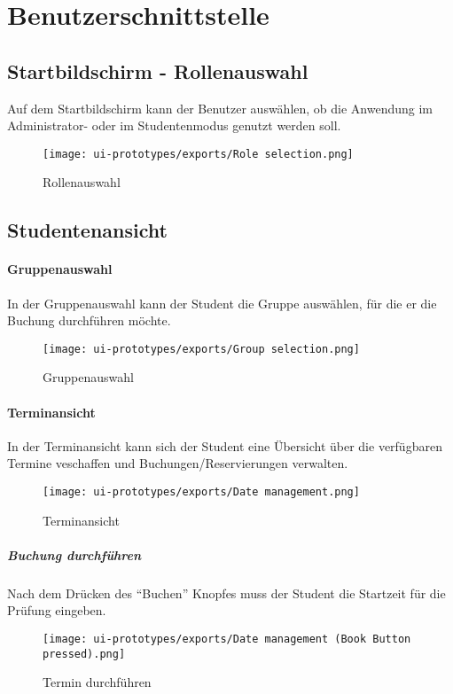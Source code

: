\section{Benutzerschnittstelle}
\subsection{Startbildschirm - Rollenauswahl}
Auf dem Startbildschirm kann der Benutzer auswählen, ob die Anwendung im
Administrator- oder im Studentenmodus genutzt werden soll.
\begin{figure}
  \centering
  \texttt{[image: ui-prototypes/exports/Role selection.png]}
  \caption{Rollenauswahl}
  \label{fig:role-selection}
\end{figure}

\subsection{Studentenansicht}

\paragraph{Gruppenauswahl}
In der Gruppenauswahl kann der Student die Gruppe auswählen, für die er
die Buchung durchführen möchte.
\begin{figure}
  \centering
  \texttt{[image: ui-prototypes/exports/Group selection.png]}
  \caption{Gruppenauswahl}
  \label{fig:group-selection}
\end{figure}

\paragraph{Terminansicht}
In der Terminansicht kann sich der Student eine Übersicht über die
verfügbaren Termine veschaffen und Buchungen/Reservierungen verwalten.
\begin{figure}
  \centering
  \texttt{[image: ui-prototypes/exports/Date management.png]}
  \caption{Terminansicht}
  \label{fig:date-management}
\end{figure}

\subparagraph{Buchung durchführen}
Nach dem Drücken des ``Buchen'' Knopfes muss der Student die Startzeit
für die Prüfung eingeben.
\begin{figure}
  \centering
  \texttt{[image: ui-prototypes/exports/Date management (Book Button pressed).png]}
  \caption{Termin durchführen}
  \label{fig:date-management-book-button-pressed}
\end{figure}

